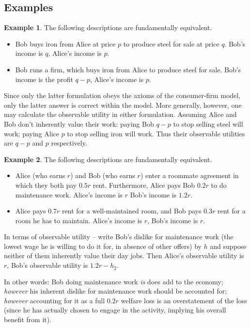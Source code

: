 \documentclass{journal}
\theoremstyle{plain}
\theoremstyle{definition}
\newtheorem{eg}{Example}
\begin{document}
\subsection{Examples}
\label{sec:eg}

\begin{eg}
    \label{eg:1}
    The following descriptions are fundamentally equivalent.
    \begin{itemize}
        \item Bob buys iron from Alice at price $p$ to produce steel for sale at price $q$. Bob's income is $q$, Alice's income is $p$.
        \item Bob runs a firm, which buys iron from Alice to produce steel for sale. Bob's income is the profit $q-p$, Alice's income is $p$.
    \end{itemize}
    Since only the latter formulation obeys the axioms of the consumer-firm model, only the latter answer is correct within the model. More generally, however, one may calculate the observable utility in either formulation. Assuming Alice and Bob don't inherently value their work: paying Bob $q-p$ to stop selling steel will work; paying Alice $p$ to stop selling iron will work. Thus their observable utilities are $q-p$ and $p$ respectively.
\end{eg}

\begin{eg}
    \label{eg:2}
    The following descriptions are fundamentally equivalent.
    \begin{itemize}
        \item Alice (who earns $r$) and Bob (who earns $r$) enter a roommate agreement in which they both pay $0.5r$ rent. Furthermore, Alice pays Bob $0.2r$ to do maintenance work. Alice's income is $r$ Bob's income is $1.2r$.
        \item Alice pays $0.7r$ rent for a well-maintained room, and Bob pays $0.3r$ rent for a room he has to maintain. Alice's income is $r$, Bob's income is $r$.
    \end{itemize}
    In terms of observable utility -- write Bob's dislike for maintenance work (the lowest wage he is willing to do it for, in absence of other offers) by $h$ and suppose neither of them inherently value their day jobs. Then Alice's observable utility is $r$, Bob's observable utility is $1.2r-h_2$.
    
    In other words: Bob doing maintenance work \emph{is} does add to the economy; \emph{however} his inherent dislike for maintenance work should be accounted for; \emph{however} accounting for it as a full $0.2r$ welfare loss is an overstatement of the loss (since he has actually chosen to engage in the activity, implying his overall benefit from it).
\end{eg}
\end{document}
